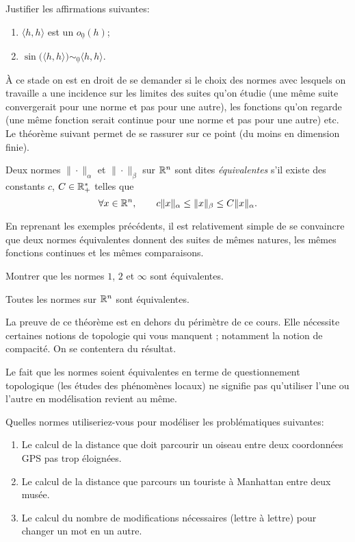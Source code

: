 \documentclass[11pt, a4paper]{article}
\begin{document}
\begin{question}
  Justifier les affirmations suivantes:
  \begin{enumerate}
  \item $\langle h, h \rangle$ est un $o_{\underline{0}}(h)$;
  \item
    $\sin\big(\langle h, h \rangle\big) \sim_{\underline{0}} \langle
    h, h \rangle$.
  \end{enumerate}
\end{question}
À ce stade on est en droit de se demander si le choix des normes avec
lesquels on travaille a une incidence sur les limites des suites qu'on
étudie (une même suite convergerait pour une norme et pas pour une
autre), les fonctions qu'on regarde (une même fonction serait continue
pour une norme et pas pour une autre) etc. Le théorème suivant permet
de se rassurer sur ce point (du moins en dimension finie).
\begin{defn}
  Deux normes $\|\cdot\|_\alpha$ et $\|\cdot\|_\beta$ sur $\mathbb{R}^n$ sont
  dites \emph{équivalentes} s'il existe des constants $c$,
  $C \in \mathbb{R}_+^*$ telles que
  \[
    \forall x \in \mathbb{R}^n, \qquad c\|x\|_\alpha \leq \|x\|_\beta \leq
    C\|x\|_\alpha.
  \]
\end{defn}
En reprenant les exemples précédents, il est relativement simple de se
convaincre que deux normes équivalentes donnent des suites de mêmes
natures, les mêmes fonctions continues et les mêmes comparaisons.
\begin{question}
  Montrer que les normes $1$, $2$ et $\infty$ sont équivalentes.
\end{question}
\begin{thm}
  Toutes les normes sur $\mathbb{R}^n$ sont équivalentes.
\end{thm}
\begin{rem}
  La preuve de ce théorème est en dehors du périmètre de ce
  cours. Elle nécessite certaines notions de topologie qui vous
  manquent ; notamment la notion de compacité. On se contentera du
  résultat.
\end{rem}
Le fait que les normes soient équivalentes en terme de questionnement
topologique (les études des phénomènes locaux) ne signifie pas
qu'utiliser l'une ou l'autre en modélisation revient au même.
\begin{question}
  Quelles normes utiliseriez-vous pour modéliser les problématiques
  suivantes:
  \begin{enumerate}
  \item Le calcul de la distance que doit parcourir un oiseau entre
    deux coordonnées GPS pas trop éloignées.
  \item Le calcul de la distance que parcours un touriste à Manhattan
    entre deux musée.
  \item Le calcul du nombre de modifications nécessaires (lettre à
    lettre) pour changer un mot en un autre.
  \end{enumerate}
\end{question}
\end{document}
